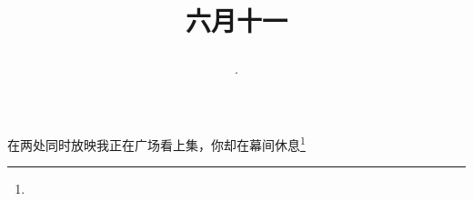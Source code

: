 \title{\date[d=16,m=7,y=2024][year:cn-y,年,month:cn,day:cn,日,·,weekday]·六月十一 }
在两处同时放映我正在广场看上集，你却在幕间休息\footnote{ }


